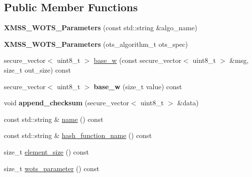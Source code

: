 \subsection*{Public Member Functions}
\begin{DoxyCompactItemize}
\item 
\mbox{\label{class_botan_1_1_x_m_s_s___w_o_t_s___parameters_a675efe5f9bd0e6aede345ed18072ac49}} 
{\bfseries X\+M\+S\+S\+\_\+\+W\+O\+T\+S\+\_\+\+Parameters} (const std\+::string \&algo\+\_\+name)
\item 
\mbox{\label{class_botan_1_1_x_m_s_s___w_o_t_s___parameters_ac47da0c4bf533e8ff641a347e1e6666c}} 
{\bfseries X\+M\+S\+S\+\_\+\+W\+O\+T\+S\+\_\+\+Parameters} (ots\+\_\+algorithm\+\_\+t ots\+\_\+spec)
\item 
secure\+\_\+vector$<$ uint8\+\_\+t $>$ \mbox{\hyperlink{class_botan_1_1_x_m_s_s___w_o_t_s___parameters_a9e0a602c991a69061c24d062363d43a7}{base\+\_\+w}} (const secure\+\_\+vector$<$ uint8\+\_\+t $>$ \&msg, size\+\_\+t out\+\_\+size) const
\item 
\mbox{\label{class_botan_1_1_x_m_s_s___w_o_t_s___parameters_a9611b34cec9ddac0bc41463a0bacf68b}} 
secure\+\_\+vector$<$ uint8\+\_\+t $>$ {\bfseries base\+\_\+w} (size\+\_\+t value) const
\item 
\mbox{\label{class_botan_1_1_x_m_s_s___w_o_t_s___parameters_a9857ccfc25d7d6e5222e471a5795e062}} 
void {\bfseries append\+\_\+checksum} (secure\+\_\+vector$<$ uint8\+\_\+t $>$ \&data)
\item 
const std\+::string \& \mbox{\hyperlink{class_botan_1_1_x_m_s_s___w_o_t_s___parameters_a8ab4c1563ea45a0a612580f52b99ccd6}{name}} () const
\item 
const std\+::string \& \mbox{\hyperlink{class_botan_1_1_x_m_s_s___w_o_t_s___parameters_af21ced80c6176475b613ab966811e6aa}{hash\+\_\+function\+\_\+name}} () const
\item 
size\+\_\+t \mbox{\hyperlink{class_botan_1_1_x_m_s_s___w_o_t_s___parameters_a41865ec18f86aa5a995de1c452df2b65}{element\+\_\+size}} () const
\item 
size\+\_\+t \mbox{\hyperlink{class_botan_1_1_x_m_s_s___w_o_t_s___parameters_a1226fc756a477864962d5a0d1c88184b}{wots\+\_\+parameter}} () const

\end{DoxyCompactItemize}
